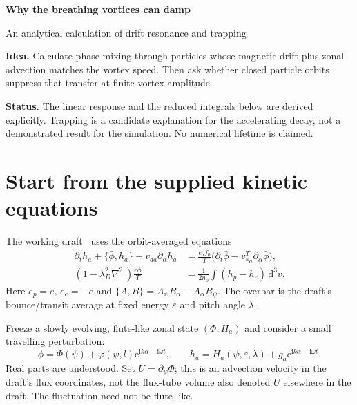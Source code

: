 \documentclass[10pt,a4paper]{article}
\newcommand{\dd}{\mathrm{d}}
\newcommand{\ii}{\mathrm{i}}
\newcommand{\E}{\mathrm{e}}
\newcommand{\phibar}{\bar\phi}
\newcommand{\vd}{\bar v_{da}}
\begin{document}
\fontsize{10.5}{13}\selectfont
{\LARGE\sffamily\bfseries\color{navy}Why the breathing vortices can damp\par}
\vspace{3pt}
{\large\sffamily\color{muted}An analytical calculation of drift resonance and trapping\par}
\begin{tcolorbox}
\textbf{Idea.} Calculate phase mixing through particles whose magnetic drift plus zonal advection matches the vortex speed. Then ask whether closed particle orbits suppress that transfer at finite vortex amplitude.\par
\textbf{Status.} The linear response and the reduced integrals below are derived explicitly. Trapping is a candidate explanation for the accelerating decay, not a demonstrated result for the simulation. No numerical lifetime is claimed.
\end{tcolorbox}

\section{Start from the supplied kinetic equations}
The working draft~\cite{draft} uses the orbit-averaged equations
\begin{align}
 \partial_t h_a+\{\phibar,h_a\}+\vd\partial_\alpha h_a
 &=\frac{e_af_0}{T}\bigl(\partial_t\phibar-v_{*a}^{T}\partial_\alpha\phibar\bigr),\label{eq:kinetic}\\
 (1-\lambda_D^2\nabla_\perp^2)\frac{e\phi}{T}
 &=\frac{1}{2n_0}\int(h_p-h_e)\,\dd^3v.\label{eq:field}
\end{align}
Here $e_p=e$, $e_e=-e$ and $\{A,B\}=A_\psi B_\alpha-A_\alpha B_\psi$.
The overbar is the draft's bounce/transit average at fixed energy $\varepsilon$ and pitch angle $\lambda$.

Freeze a slowly evolving, flute-like zonal state $(\Phi,H_a)$ and consider a small travelling perturbation:
\begin{equation}
 \phi=\Phi(\psi)+\varphi(\psi,l)\E^{\ii k\alpha-\ii\omega t},
 \qquad
 h_a=H_a(\psi,\varepsilon,\lambda)+g_a\E^{\ii k\alpha-\ii\omega t}.
 \label{eq:ansatz}
\end{equation}
Real parts are understood. Set $U=\partial_\psi\Phi$; this is an advection velocity in the draft's flux coordinates, not the flux-tube volume also denoted $U$ elsewhere in the draft. The fluctuation need not be flute-like.
\end{document}
